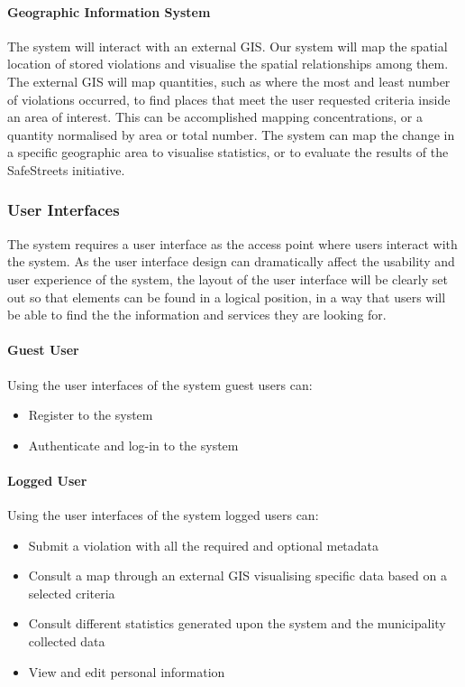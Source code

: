 \label{gis}	
\paragraph{Geographic Information System} The system will interact with an external GIS. Our system will map the spatial location of stored violations and visualise the spatial relationships among them. The external GIS will map quantities, such as where the most and least number of violations occurred, to find places that meet the user requested criteria inside an area of interest. This can be accomplished mapping concentrations, or a quantity normalised by area or total number. The system can map the change in a specific geographic area to visualise statistics, or to evaluate the results of the SafeStreets initiative.	

\subsubsection{User Interfaces}
\label{sec:userinterdaces}

The system requires a user interface as the access point where users interact with the system. As the user interface design can dramatically affect the usability and user experience of the system, the layout of the user interface will be clearly set out so that elements can be found in a logical position, in a way that users will be able to find the the information and services they are looking for.

\paragraph{Guest User}
	Using the user interfaces of the system guest users can:
	\begin{itemize}
		\item Register to the system
		\item Authenticate and log-in to the system
	\end{itemize}
	
\paragraph{Logged User}
	Using the user interfaces of the system logged users can:
	\begin{itemize}
		\item Submit a violation with all the required and optional metadata
		\item Consult a map through an external GIS visualising specific data based on a selected criteria
		\item Consult different statistics generated upon the system and the municipality collected data
		\item View and edit personal information
	\end{itemize}
		
